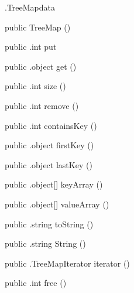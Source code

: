\begin{CrexxClass}{.TreeMap}{data}

  \begin{Hierarchy}
  \end{Hierarchy}

  \begin{Members}

    \Factory
      {public}
      {TreeMap}
      {()}

    \Method
      {public}
      {.int}
      {put}
      {}

    \Method
      {public}
      {.object}
      {get}
      {()}

    \Method
      {public}
      {.int}
      {size}
      {()}

    \Method
      {public}
      {.int}
      {remove}
      {()}

    \Method
      {public}
      {.int}
      {containsKey}
      {()}

    \Method
      {public}
      {.object}
      {firstKey}
      {()}

    \Method
      {public}
      {.object}
      {lastKey}
      {()}

    \Method
      {public}
      {.object[]}
      {keyArray}
      {()}

    \Method
      {public}
      {.object[]}
      {valueArray}
      {()}

    \Method
      {public}
      {.string}
      {toString}
      {()}

    \Method
      {public}
      {.string}
      {String}
      {()}

    \Method
      {public}
      {.TreeMapIterator}
      {iterator}
      {()}

    \Method
      {public}
      {.int}
      {free}
      {()}

  \end{Members}
\end{CrexxClass}

